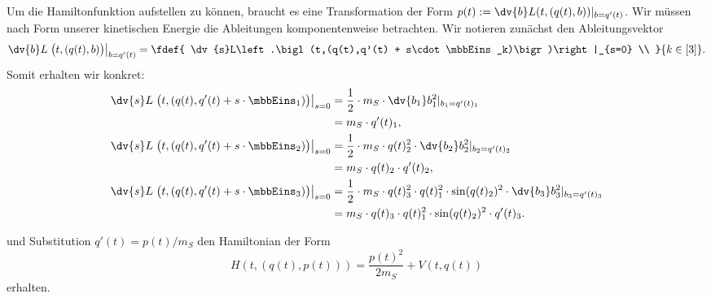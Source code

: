 \documentclass{subfiles}
\begin{document}
    Um die Hamiltonfunktion aufstellen zu können, braucht es eine Transformation der Form $p(t):=\dv{b}L(t,(q(t),b))|_{b=q'(t)}$.
    Wir müssen nach Form unserer kinetischen Energie die Ableitungen komponentenweise betrachten. Wir notieren zunächst den Ableitungsvektor
    \[
        \dv{b}L\left.\bigl(t,(q(t),b)\bigr)\right|_{b=q'(t)} = \fdef{
            \dv{s}L\left.\bigl(t,(q(t),q'(t) + s\cdot\mbbEins_k)\bigr)\right|_{s=0} \\
        }{k\in[3]}.
    \]
    Somit erhalten wir konkret:
    \begin{align*}
        \dv{s}L\left.\bigl(t,(q(t),q'(t) + s\cdot\mbbEins_1)\bigr)\right|_{s=0} &= \frac12\cdot m_S\cdot\dv{b_1}b_1^2|_{b_1 = q'(t)_1}\\
        &= m_S\cdot q'(t)_1, \\
        \dv{s}L\left.\bigl(t,(q(t),q'(t) + s\cdot\mbbEins_2)\bigr)\right|_{s=0} &= \frac12\cdot m_S\cdot q(t)_2^2\cdot\dv{b_2}b_2^2|_{b_2 = q'(t)_2} \\
        &= m_S\cdot q(t)_2\cdot q'(t)_2,\\
        \dv{s}L\left.\bigl(t,(q(t),q'(t) + s\cdot\mbbEins_3)\bigr)\right|_{s=0} &= \frac12\cdot m_S\cdot q(t)_3^2\cdot q(t)_1^2\cdot\sin(q(t)_2)^2\cdot\dv{b_3}b_3^2|_{b_3 = q'(t)_3} \\
        &= m_S\cdot q(t)_3\cdot q(t)_1^2\cdot\sin(q(t)_2)^2\cdot q'(t)_3.
    \end{align*}

    und Substitution $q'(t) = p(t) / m_S$ den Hamiltonian der Form 
    \[
        H(t,(q(t),p(t))) = \frac{p(t)^2}{2m_S} + V(t,q(t))
    \]
    erhalten.
\end{document}
